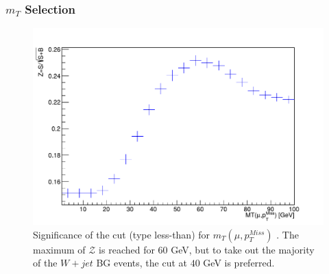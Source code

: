 \documentclass{beamer}
\begin{document}
\begin{frame}
\frametitle{$m_T$ Selection}

\begin{figure}[!h]
	
	\centering
	\includegraphics[scale=0.45]{pictures/Selection/m_T/Sig-m_T}
	\caption{{\scriptsize Significance of the cut (type less-than) for $m_T(\mu,p_{T}^{Miss})$ . The maximum of $\mathcal{Z}$ is reached for $60$ GeV, but to take out the majority of the $W+jet$ BG events, the cut at $40$ GeV is preferred.}}
	\label{Sig-m_T}
	
\end{figure}


\end{frame}

\end{document}
